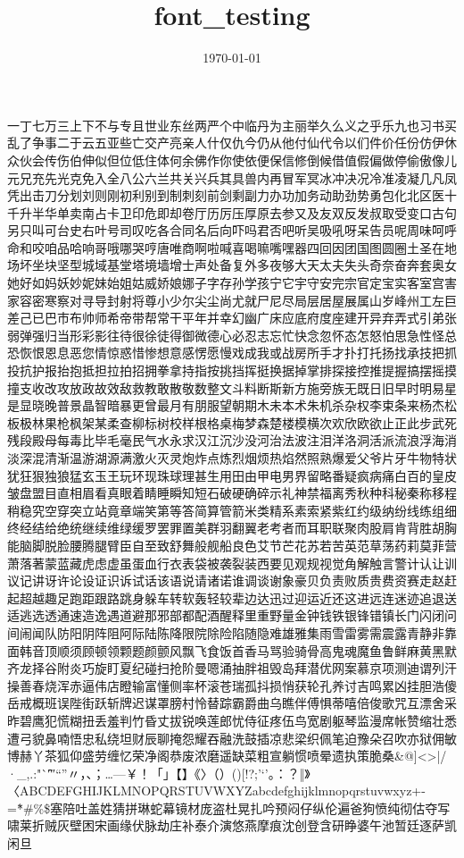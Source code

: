 \documentclass[30pt]{article}
\title{font_testing}
\date{\today}
\begin{document}
 一丁七万三上下不与专且世业东丝两严个中临丹为主丽举久么义之乎乐九也习书买乱了争事二于云五亚些亡交产亮亲人什仅仇今仍从他付仙代令以们件价任份仿伊休众伙会传伤伯伸似但位低住体何余佛作你使依便保信修倒候借值假偏做停偷傲像儿元兄充先光克免入全八公六兰共关兴兵其具兽内再冒军冥冰冲决况冷准凌凝几凡凤凭出击刀分划刘则刚初利别到制刺刻前剑剩副力办功加务动助劲势勇包化北区医十千升半华单卖南占卡卫印危即却卷厅历厉压厚原去参又及友双反发叔取受变口古句另只叫可台史右叶号司叹吃各合同名后向吓吗君否吧听吴吸吼呀呆告员呢周味呵呼命和咬咱品哈响哥哦哪哭哼唐唯商啊啦喊喜喝嘛嘴嘿器四回因团国图圆圈土圣在地场坏坐块坚型城域基堂塔境墙增士声处备复外多夜够大天太夫失头奇奈奋奔套奥女她好如妈妖妙妮妹始姐姑威娇娘娜子字存孙学孩宁它宇守安完宗官定宝实客室宫害家容密寒察对寻导封射将尊小少尔尖尘尚尤就尸尼尽局层居屋展属山岁峰州工左巨差己已巴市布帅师希帝带帮常干平年并幸幻幽广床应底府度座建开异弃弄式引弟张弱弹强归当形彩影往待很徐徒得御微德心必忍志忘忙快念忽怀态怎怒怕思急性怪总恐恢恨恩息恶您情惊惑惜惨想意感愣愿慢戏成我或战房所手才扑打托扬找承技把抓投抗护报抬抱抵担拉拍招拥拳拿持指按挑挡挥挺换据掉掌排探接控推提握搞摆摇摸撞支收改攻放政故效敌救教敢散敬数整文斗料断斯新方施旁族无既日旧早时明易星是显晓晚普景晶智暗暴更曾最月有朋服望朝期木未本术朱机杀杂权李束条来杨杰松板极林果枪枫架某柔查柳标树校样根格桌梅梦森楚楼模横次欢欣欧欲止正此步武死残段殿母每毒比毕毛毫民气水永求汉江沉沙没河治法波注泪洋洛洞活派流浪浮海消淡深混清渐温游湖源满激火灭灵炮炸点炼烈烟烦热焰然照熟爆爱父爷片牙牛物特状犹狂狠独狼猛玄玉王玩环现珠球理甚生用田由甲电男界留略番疑疯病痛白百的皇皮皱盘盟目直相眉看真眼着睛睡瞬知短石破硬确碎示礼神禁福离秀秋种科秘秦称移程稍稳究空穿突立站竟章端笑第等答简算管箭米类精系素索紧紫红约级纳纷线练组细终经结给绝统继续维绿缓罗罢罪置美群羽翻翼老考者而耳职联聚肉股肩肯背胜胡胸能脑脚脱脸腰腾腿臂臣自至致舒舞般舰船良色艾节芒花苏若苦英范草荡药莉莫菲营萧落著蒙蓝藏虎虑虚虽蛋血行衣表袋被袭裂装西要见观规视觉角解触言警计认让训议记讲讶许论设证识诉试话该语说请诸诺谁调谈谢象豪贝负责败质贵费资赛走赵赶起超越趣足跑距跟路跳身躲车转软轰轻较辈边达迅过迎运近还这进远连迷迹追退送适逃选透通速造逸遇道避那邪部都配酒醒释里重野量金钟钱铁银锋错镇长门闪闭问间闹闻队防阳阴阵阻阿际陆陈降限院除险陷随隐难雄雅集雨雪雷雾需震露青静非靠面韩音顶顺须顾顿领颗题颜颤风飘飞食饭首香马骂验骑骨高鬼魂魔鱼鲁鲜麻黄黑默齐龙择谷附炎巧旋盯夏纪碰扫抢阶曼嗯涌抽胖祖毁岛拜潜优网案慕京项测迪谓列汗操善春烧浑赤逼伟店瞪输富懂侧率杯滚苍瑞孤抖损悄获轮孔养讨吉鸣累凶挂胆浩傻岳戒概班误陛街跃斩牌迟谋罩膀村怜替踪霸爵曲乌瞧伴傅惧蒂嘻倍俊歌咒互漂舍采昨碧鹰犯慌糊扭丢羞判竹昏丈拔锐唤莲郎忧侍征疼伍鸟宽剧躯琴监漫席帐赞缩壮悉遭弓貌鼻喃悟忠私绕坦财辰聊掩怨耀吞融洗鼓插凉悲梁织佩笔迫豫朵召吹亦狱佣敏博赫丫茶狐仰盛劳缠忆荣净阁恭废浓磨遥缺菜粗宣躺惯喷晕遗执策脆桑\&@{}]<>|/·\_,.:"`\^′″“”〃，、；…—￥！「」【】《〉（）()[!?;'‘’。：？‖》〈ABCDEFGHIJKLMNOPQRSTUVWXYZabcdefghijklmnopqrstuvwxyz+- =\~*#\%\$塞陪吐盖姓猜拼琳蛇幕镜材庞盗杜晃扎吟预闷仔纵伦遍爸狗愤纯彻估夺写啸莱折贼灰壁困宋画缘伏脉劫庄补泰介演悠燕摩痕沈创登含研睁婆午池暂廷逐萨凯闲旦
\end{document}
